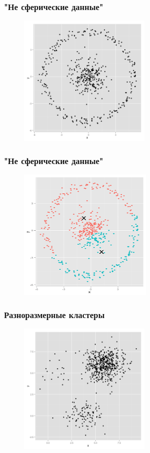 \documentclass[12pt]{beamer}
\begin{document}
\begin{frame}\frametitle{"Не сферические данные"}
\begin{figure}[htbp]
  \includegraphics[height=180pt, keepaspectratio = true]{images/non_spherical-1}  
\end{figure}
\end{frame}	

\begin{frame}\frametitle{"Не сферические данные"}
\begin{figure}[htbp]
  \includegraphics[height=180pt, keepaspectratio = true]{images/non_spherical-2}  
\end{figure}
\end{frame}

\begin{frame}\frametitle{Разноразмерные кластеры}
\begin{figure}[htbp]
  \includegraphics[height=180pt, keepaspectratio = true]{images/different_sizes-1}  
\end{figure}
\end{frame}
\end{document}
